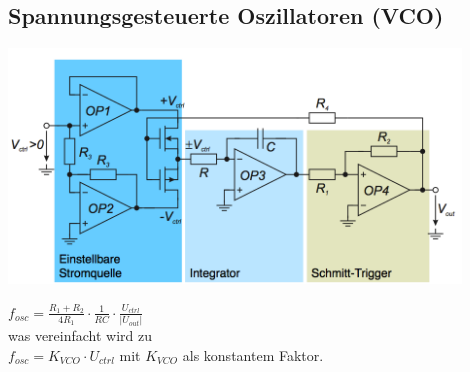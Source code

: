 	\subsection{Spannungsgesteuerte Oszillatoren (VCO)}
		\begin{minipage}{12cm}
			\includegraphics[width=12cm]{./bilder/vco.png}
		\end{minipage}
		\begin{minipage}{6cm}
			$f_{osc} = \frac{R_1 + R_2}{4 R_1} \cdot \frac{1}{RC} \cdot \frac{U_{ctrl}}{|U_{out}|}$ \\
			
			was vereinfacht wird zu \\
			$f_{osc} = K_{VCO} \cdot U_{ctrl}$ mit $K_{VCO}$ als konstantem Faktor.
		\end{minipage}